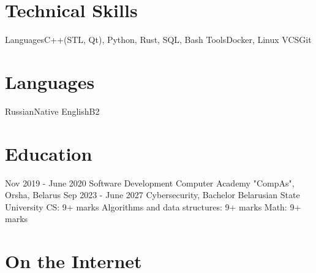 \documentclass[11pt,a4paper]{moderncv}
\begin{document}
\section{Technical Skills}
\cvline
  {Languages}{C++(STL, Qt), Python, Rust, SQL, Bash}
\cvline 
  {Tools}{Docker, Linux}
\cvline
  {VCS}{Git}
\section {Languages}
\cvline 
  {Russian}{Native}
\cvline 
  {English}{B2}
\section{Education}
  \cventry
    {Nov 2019 - June 2020}
    {Software Development}
    {Computer Academy "CompAs", Orsha, Belarus}
    {}{}{}
  \cventry
    {Sep 2023 - June 2027}
    {Cybersecurity, Bachelor}
    {Belarusian State University
    \newline CS: 9+ marks
    \newline Algorithms and data structures: 9+ marks
    \newline Math: 9+ marks} 
    {}{}{}

\section{On the Internet}
\end{document}

